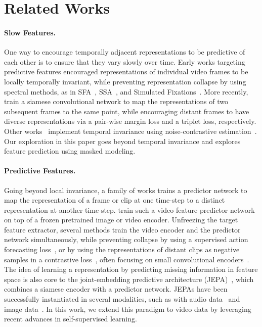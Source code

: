 \documentclass[twocolumn]{fairmeta}
\theoremstyle{plain}
\theoremstyle{definition}
\theoremstyle{remark}
\begin{document}
\section{Related Works}

\paragraph{\bf Slow Features.}
One way to encourage temporally adjacent representations to be predictive of each other is to ensure that they vary slowly over time.
Early works targeting predictive features encouraged representations of individual video frames to be locally temporally invariant, while preventing representation collapse by using spectral methods, as in SFA~\citep{wiskott2002slow}, SSA~\citep{kayser2001extracting}, and Simulated Fixations~\citep{zou2012deep}.
More recently,~\citet{goroshin2015unsupervised, wang2010learning} train a siamese convolutional network to map the representations of two subsequent frames to the same point, while encouraging distant frames to have diverse representations via a pair-wise margin loss and a triplet loss, respectively.
Other works~\citep{oord2018representation, suris2021learning, feichtenhofer2021large} implement temporal invariance using noise-contrastive estimation~\citep{gutmann2012noise}.
Our exploration in this paper goes beyond temporal invariance and explores feature prediction using masked modeling.
\vspace{-2mm}

\paragraph{\bf Predictive Features.}
Going beyond local invariance, a family of works trains a predictor network to map the representation of a frame or clip at one time-step to a distinct representation at another time-step.
\citet{srivastava2015unsupervised, vondrick2016anticipating, wang2023masked} train such a video feature predictor network on top of a frozen pretrained image or video encoder.
Unfreezing the target feature extractor, several methods train the video encoder and the predictor network simultaneously, while preventing collapse by using a supervised action forecasting loss~\citep{girdhar2021anticipative}, or by using the representations of distant clips as negative samples in a contrastive loss~\citep{han2019video, han2020memory, tan2023multiscale}, often focusing on small convolutional encoders~\citep{han2019video, han2020memory}.
The idea of learning a representation by predicting missing information in feature space is also core to the  joint-embedding predictive architecture (JEPA)~\citep{lecun2022path}, which combines a siamese encoder with a predictor network.
JEPAs have been successfully instantiated in several modalities, such as with audio data~\citep{ baevski2022data2vec} and image data~\citep{zhou2021ibotyes,oquab2023dinov2,assran2023self}.
In this work, we extend this paradigm to video data by leveraging recent advances in self-supervised learning.
\vspace{-1mm}
\end{document}
